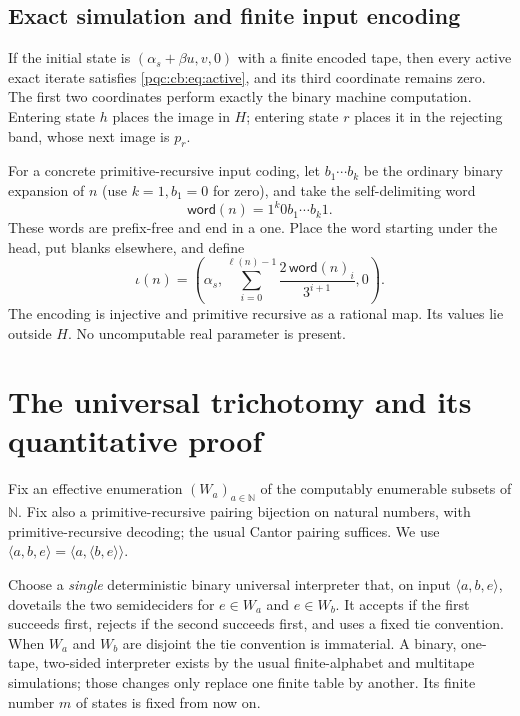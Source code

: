 \documentclass[11pt,letterpaper]{article}
\numberwithin{equation}{section}
\theoremstyle{definition}
\theoremstyle{remark}
\newcommand{\N}{\mathbb N}
\newcommand{\cenum}{computably enumerable}
\begin{document}
\subsection{Exact simulation and finite input encoding}

If the initial state is $(\alpha_s+\beta u,v,0)$ with a finite encoded tape,
then every active exact iterate satisfies \eqref{pqc:cb:eq:active}, and its third
coordinate remains zero.  The first two coordinates perform exactly the
binary machine computation.  Entering state $h$ places the image in $H$;
entering state $r$ places it in the rejecting band, whose next image is $p_r$.

For a concrete primitive-recursive input coding, let $b_1\cdots b_k$ be the
ordinary binary expansion of $n$ (use $k=1,b_1=0$ for zero), and take the
self-delimiting word
\begin{equation}
 \mathsf{word}(n)=1^k0b_1\cdots b_k1.
 \label{pqc:cb:eq:word}
\end{equation}
These words are prefix-free and end in a one.  Place the word starting under
the head, put blanks elsewhere, and define
\begin{equation}
 \iota(n)=\left(\alpha_s,
       \sum_{i=0}^{\ell(n)-1}\frac{2\,\mathsf{word}(n)_i}{3^{i+1}},0\right).
 \label{pqc:cb:eq:input}
\end{equation}
The encoding is injective and primitive recursive as a rational map.  Its
values lie outside $H$.  No uncomputable real parameter is present.

\section{The universal trichotomy and its quantitative proof}
\label{pqc:cb:sec:universal}

Fix an effective enumeration $(W_a)_{a\in\N}$ of the \cenum{} subsets of $\N$.
Fix also a primitive-recursive pairing bijection on natural numbers, with
primitive-recursive decoding; the usual Cantor pairing suffices.  We use
$\langle a,b,e\rangle=\langle a,\langle b,e\rangle\rangle$.

Choose a \emph{single} deterministic binary universal interpreter that, on
input $\langle a,b,e\rangle$, dovetails the two semideciders for
$e\in W_a$ and $e\in W_b$.  It accepts if the first succeeds first, rejects
if the second succeeds first, and uses a fixed tie convention.  When $W_a$
and $W_b$ are disjoint the tie convention is immaterial.  A binary, one-tape,
two-sided interpreter exists by the usual finite-alphabet and multitape
simulations; those changes only replace one finite table by another.  Its
finite number $m$ of states is fixed from now on.
\end{document}
